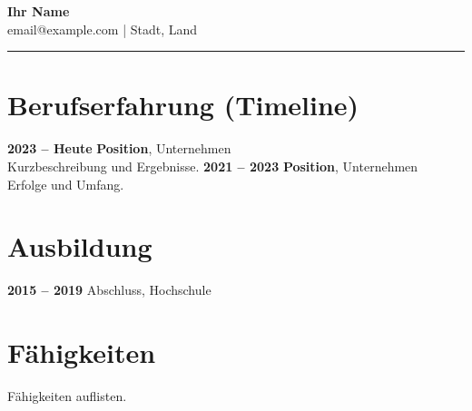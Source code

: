 \documentclass[11pt,a4paper]{article}
\begin{document}
\begin{center}
{\LARGE \textbf{Ihr Name}}\\[0.2em]
email@example.com \quad | \quad Stadt, Land
\end{center}
\begin{flushright}\rule{2cm}{2.5cm}\end{flushright}
\vspace{0.6em}
\section*{Berufserfahrung (Timeline)}
\textbf{2023 -- Heute} \quad \textbf{Position}, Unternehmen \\
Kurzbeschreibung und Ergebnisse.
\vspace{0.3em}
\textbf{2021 -- 2023} \quad \textbf{Position}, Unternehmen \\
Erfolge und Umfang.
\vspace{0.5em}
\section*{Ausbildung}
\textbf{2015 -- 2019} \quad Abschluss, Hochschule
\section*{Fähigkeiten}
Fähigkeiten auflisten.
\end{document}
